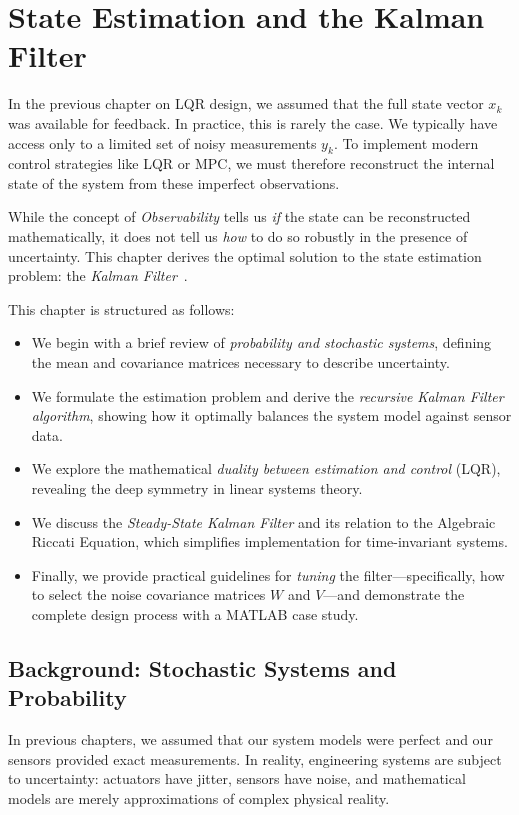 \chapter{State Estimation and the Kalman Filter}
\label{chap:kalman}

In the previous chapter on LQR design, we assumed that the full state vector $x_k$ was available for feedback. In practice, this is rarely the case. We typically have access only to a limited set of noisy measurements $y_k$. To implement modern control strategies like LQR or MPC, we must therefore reconstruct the internal state of the system from these imperfect observations.

While the concept of \emph{Observability} tells us \textit{if} the state can be reconstructed mathematically, it does not tell us \textit{how} to do so robustly in the presence of uncertainty. This chapter derives the optimal solution to the state estimation problem: the \emph{Kalman Filter}~\cite{Kalman1960}.

This chapter is structured as follows:
\begin{itemize}
	\item We begin with a brief review of \emph{probability and stochastic systems}, defining the mean and covariance matrices necessary to describe uncertainty.
	\item We formulate the estimation problem and derive the \emph{recursive Kalman Filter algorithm}, showing how it optimally balances the system model against sensor data.
	\item We explore the mathematical \emph{duality between estimation and control} (LQR), revealing the deep symmetry in linear systems theory.
	\item We discuss the \emph{Steady-State Kalman Filter} and its relation to the Algebraic Riccati Equation, which simplifies implementation for time-invariant systems.
	\item Finally, we provide practical guidelines for \emph{tuning} the filter—specifically, how to select the noise covariance matrices $W$ and $V$—and demonstrate the complete design process with a MATLAB case study.
\end{itemize}

\section{Background: Stochastic Systems and Probability}

In previous chapters, we assumed that our system models were perfect and our sensors provided exact measurements. In reality, engineering systems are subject to uncertainty: actuators have jitter, sensors have noise, and mathematical models are merely approximations of complex physical reality.

